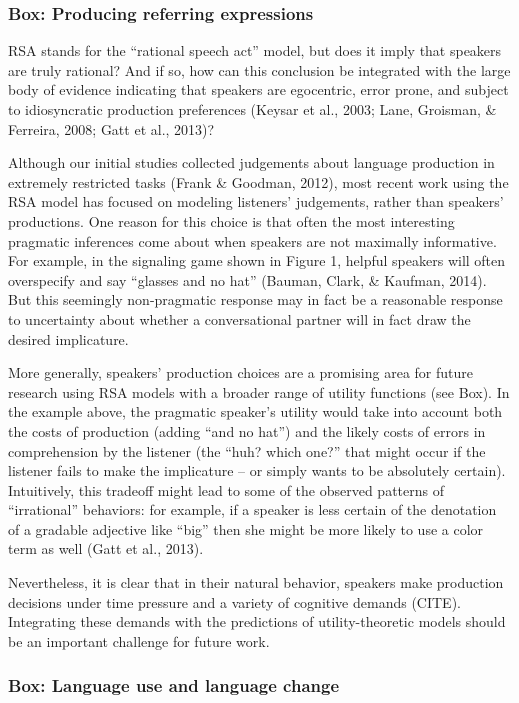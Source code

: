 \documentclass[]{elsarticle}
\begin{document}
\subsubsection{Box: Producing referring expressions
}\label{box-producing-referring-expressions}

RSA stands for the ``rational speech act'' model, but does it imply that
speakers are truly rational? And if so, how can this conclusion be
integrated with the large body of evidence indicating that speakers are
egocentric, error prone, and subject to idiosyncratic production
preferences (Keysar et al., 2003; Lane, Groisman, \& Ferreira, 2008;
Gatt et al., 2013)?

Although our initial studies collected judgements about language
production in extremely restricted tasks (Frank \& Goodman, 2012), most
recent work using the RSA model has focused on modeling listeners'
judgements, rather than speakers' productions. One reason for this
choice is that often the most interesting pragmatic inferences come
about when speakers are not maximally informative. For example, in the
signaling game shown in Figure 1, helpful speakers will often
overspecify and say ``glasses and no hat'' (Bauman, Clark, \& Kaufman,
2014). But this seemingly non-pragmatic response may in fact be a
reasonable response to uncertainty about whether a conversational
partner will in fact draw the desired implicature.

More generally, speakers' production choices are a promising area for
future research using RSA models with a broader range of utility
functions (see Box). In the example above, the pragmatic speaker's
utility would take into account both the costs of production (adding
``and no hat'') and the likely costs of errors in comprehension by the
listener (the ``huh? which one?'' that might occur if the listener fails
to make the implicature -- or simply wants to be absolutely certain).
Intuitively, this tradeoff might lead to some of the observed patterns
of ``irrational'' behaviors: for example, if a speaker is less certain
of the denotation of a gradable adjective like ``big'' then she might be
more likely to use a color term as well (Gatt et al., 2013).

Nevertheless, it is clear that in their natural behavior, speakers make
production decisions under time pressure and a variety of cognitive
demands (CITE). Integrating these demands with the predictions of
utility-theoretic models should be an important challenge for future
work.

\subsubsection{Box: Language use and language
change}\label{box-language-use-and-language-change}
\end{document}
